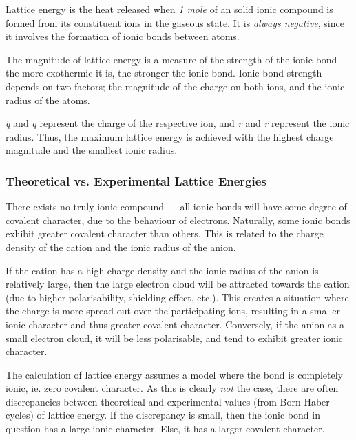 			Lattice energy is the heat released when \emph{1 mole} of an solid ionic compound is formed from its constituent ions in the
			gaseous state. It is \emph{always negative}, since it involves the formation of ionic bonds between atoms.

			The magnitude of lattice energy is a measure of the strength of the ionic bond — the more exothermic it is, the stronger the ionic bond.
			Ionic bond strength depends on two factors; the magnitude of the charge on both ions, and the ionic radius of the atoms.


			\emph{q\sbs{+}} and \emph{q\sbs{-}} represent the charge of the respective ion, and \emph{r\sbs{+}} and \emph{r\sbs{-}} represent
			the ionic radius. Thus, the maximum lattice energy is achieved with the highest charge magnitude and the smallest ionic radius.


			\subsubsection{Theoretical vs. Experimental Lattice Energies}

				There exists no truly ionic compound --- all ionic bonds will have some degree of covalent character, due to the behaviour of
				electrons. Naturally, some ionic bonds exhibit greater covalent character than others. This is related to the charge density
				of the cation and the ionic radius of the anion.

				If the cation has a high charge density and the ionic radius of the anion is relatively large, then the large electron cloud
				will be attracted towards the cation (due to higher polarisability, shielding effect, etc.). This creates a situation where the
				charge is more spread out over the participating ions, resulting in a smaller ionic character and thus greater covalent
				character. Conversely, if the anion as a small electron cloud, it will be less polarisable, and tend to exhibit greater ionic
				character.

				The calculation of lattice energy assumes a model where the bond is completely ionic, ie. zero covalent character. As this is
				clearly \textit{not} the case, there are often discrepancies between theoretical and experimental values (from Born-Haber cycles)
				of lattice energy. If the discrepancy is small, then the ionic bond in question has a large ionic character. Else, it has a
				larger covalent character.

